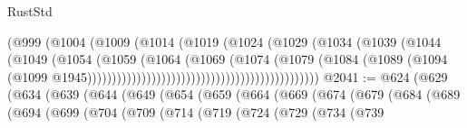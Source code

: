 \begin{lexlean}{RustStd}
\begin{coremodule}
                                                        (@999
                                                          (@1004
                                                            (@1009
                                                              (@1014
                                                                (@1019
                                                                  (@1024
                                                                    (@1029
                                                                      (@1034
                                                                        (@1039
                                                                          (@1044
                                                                            (@1049
                                                                              (@1054
                                                                                (@1059
                                                                                  (@1064
                                                                                    (@1069
                                                                                      (@1074
                                                                                        (@1079
                                                                                          (@1084
                                                                                            (@1089
                                                                                              (@1094
                                                                                                (@1099
                                                                                                  @1945)))))))))))))))))))))))))))))))))))))))))))))))
@2041 := @624
    (@629
      (@634
        (@639
          (@644
            (@649
              (@654
                (@659
                  (@664
                    (@669
                      (@674
                        (@679
                          (@684
                            (@689
                              (@694
                                (@699
                                  (@704
                                    (@709
                                      (@714
                                        (@719
                                          (@724
                                            (@729
                                              (@734
                                                (@739

\end{coremodule}
\end{lexlean}
